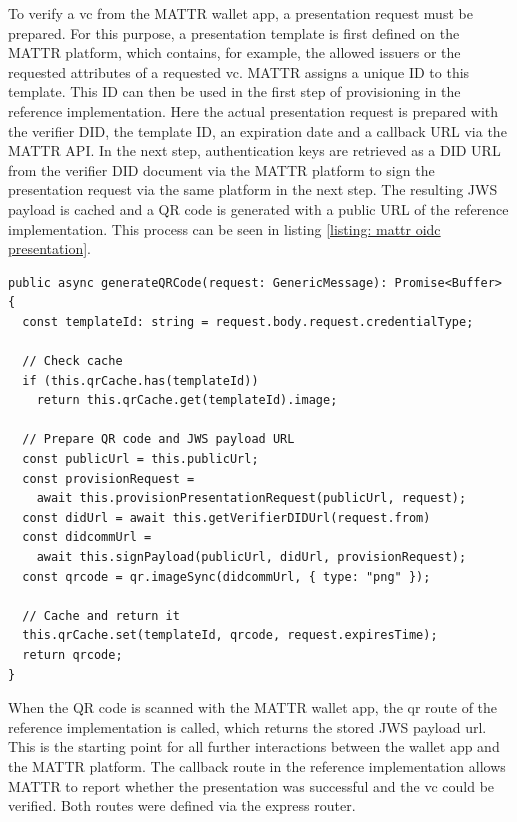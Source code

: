     To verify a \ac{vc} from the MATTR wallet app, a presentation request must be prepared. For this purpose, a presentation template is first defined on the MATTR platform, which contains, for example, the allowed issuers or the requested attributes of a requested \ac{vc}. MATTR assigns a unique ID to this template. This ID can then be used in the first step of provisioning in the reference implementation. Here the actual presentation request is prepared with the verifier DID, the template ID, an expiration date and a callback URL via the MATTR API. In the next step, authentication keys are retrieved as a DID URL from the verifier DID document via the MATTR platform to sign the presentation request via the same platform in the next step. The resulting JWS payload is cached and a QR code is generated with a public URL of the reference implementation. This process can be seen in listing \ref{listing: mattr oidc presentation}.
    \newline
\begin{lstlisting}[style=ES6, caption=Generate QR code for OIDC presentation reqest, label={listing: mattr oidc presentation}]
public async generateQRCode(request: GenericMessage): Promise<Buffer> {
  const templateId: string = request.body.request.credentialType;
  
  // Check cache
  if (this.qrCache.has(templateId)) 
    return this.qrCache.get(templateId).image;

  // Prepare QR code and JWS payload URL
  const publicUrl = this.publicUrl;
  const provisionRequest = 
    await this.provisionPresentationRequest(publicUrl, request);
  const didUrl = await this.getVerifierDIDUrl(request.from)
  const didcommUrl = 
    await this.signPayload(publicUrl, didUrl, provisionRequest); 
  const qrcode = qr.imageSync(didcommUrl, { type: "png" });
    
  // Cache and return it
  this.qrCache.set(templateId, qrcode, request.expiresTime);
  return qrcode;
}\end{lstlisting}
    
    When the QR code is scanned with the MATTR wallet app, the qr route of the reference implementation is called, which returns the stored JWS payload url. This is the starting point for all further interactions between the wallet app and the MATTR platform. The callback route in the reference implementation allows MATTR to report whether the presentation was successful and the \ac{vc} could be verified. Both routes were defined via the express router.
    
